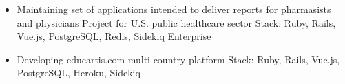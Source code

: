 \documentclass[10pt,a4paper,ragged2e]{altacv}
\begin{document}

\begin{fullwidth}
\makecvheader
\end{fullwidth}



\begin{itemize}
\item Maintaining set of applications intended to deliver reports for pharmasists and physicians \newline
Project for U.S. public healthcare sector \newline
Stack: Ruby, Rails, Vue.js, PostgreSQL, Redis, Sidekiq Enterprise
\end{itemize}

\divider

\begin{itemize}
\item Developing educartis.com multi-country platform \newline
Stack: Ruby, Rails, Vue.js, PostgreSQL, Heroku, Sidekiq
\end{itemize}
\end{document}
